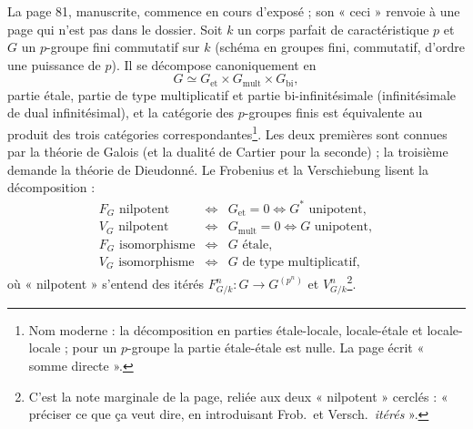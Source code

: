 \documentclass[11pt,a4paper]{article}
\begin{document}
La page 81, manuscrite, commence en cours d'exposé ; son « ceci » renvoie à
une page qui n'est pas dans le dossier. Soit $k$ un corps parfait de
caractéristique $p$ et $G$ un $p$-groupe fini commutatif sur $k$
(schéma en groupes fini, commutatif, d'ordre une puissance de $p$). Il se
décompose canoniquement en
\[
G \simeq G_{\mathrm{et}} \times G_{\mathrm{mult}} \times G_{\mathrm{bi}},
\]
partie étale, partie de type multiplicatif et partie bi-infinitésimale
(infinitésimale de dual infinitésimal), et la catégorie des $p$-groupes
finis est équivalente au produit des trois catégories
correspondantes\footnote{Nom moderne : la décomposition en parties
étale-locale, locale-étale et locale-locale ; pour un $p$-groupe la
partie étale-étale est nulle. La page écrit « somme directe ».}. Les deux
premières sont connues par la théorie de Galois (et la dualité de Cartier
pour la seconde) ; la troisième demande la théorie de Dieudonné. Le
Frobenius et la Verschiebung lisent la décomposition :
\[
\begin{array}{lcl}
F_G \text{ nilpotent} & \iff & G_{\mathrm{et}} = 0 \iff G^{*} \text{ unipotent}, \\
V_G \text{ nilpotent} & \iff & G_{\mathrm{mult}} = 0 \iff G \text{ unipotent}, \\
F_G \text{ isomorphisme} & \iff & G \text{ étale}, \\
V_G \text{ isomorphisme} & \iff & G \text{ de type multiplicatif},
\end{array}
\]
où « nilpotent » s'entend des itérés $F^{n}_{G/k} \colon G \to G^{(p^{n})}$
et $V^{n}_{G/k}$\footnote{C'est la note marginale de la page, reliée aux
deux « nilpotent » cerclés : « préciser ce que ça veut dire, en
introduisant Frob.\ et Versch.\ \emph{itérés} ».}.
\end{document}
